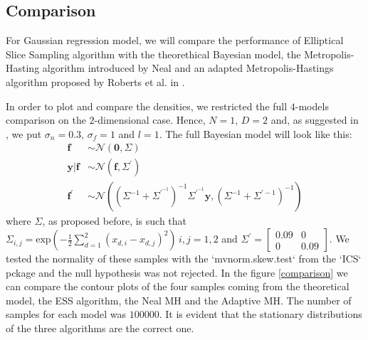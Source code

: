 \documentclass{article}
\begin{document}
\subsection{Comparison}
For Gaussian regression model, we will compare the performance of Elliptical Slice Sampling algorithm with the theorethical Bayesian model, the Metropolis-Hasting algorithm introduced by Neal \cite{Neal} and an adapted Metropolis-Hastings algorithm proposed by Roberts et al. in \cite{Roberts}. 

In order to plot and compare the densities, we restricted the full $4$-models comparison on the $2$-dimensional case. Hence, $N=1$, $D=2$ and, as suggested in \cite{MAM}, we put $\sigma_n=0.3$, $\sigma_f=1$ and $l=1$.
The full Bayesian model will look like this:
\begin{align*}
\mathbf{f}&\sim \mathcal{N}\left(\mathbf{0},\Sigma\right)\\
\mathbf{y}|\mathbf{f}&\sim\mathcal{N}\left(\mathbf{f},\Sigma^{'}\right)\\
\mathbf{f^'}&\sim\mathcal{N}\left(\left(\Sigma^{-1}+\Sigma^{'}^{-1}\right)^{-1}\Sigma^{'}^{-1}\mathbf{y},\left(\Sigma^{-1}+\Sigma^{'-1}\right)^{-1}\right)
\end{align*}
where $\Sigma$, as proposed before, is such that $\Sigma_{i,j}=\text{exp}\left(-\frac{1}{2}\sum_{d=1}^{2}(x_{d,i} - x_{d,j})^2\right)\,i,j=1,2$ and $\Sigma^{'}=\begin{bmatrix}0.09 & 0 \\ 0 & 0.09\end{bmatrix}$.
We tested the normality of these samples with the `mvnorm.skew.test` from the `ICS` pckage and the null hypothesis was not rejected.
In the figure \ref{comparison} we can compare the contour plots of the four samples coming from the theoretical model, the ESS algorithm, the Neal MH and the Adaptive MH. The number of samples for each model was $100000$. It is evident that the stationary distributions of the three algorithms are the correct one.
\end{document}
